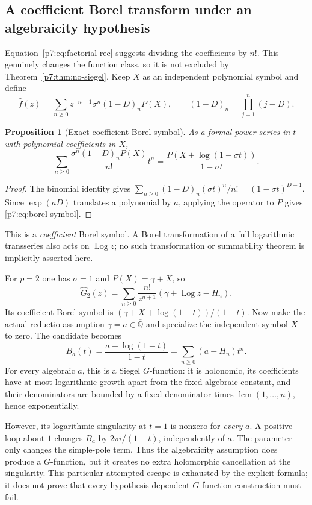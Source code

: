 \documentclass[11pt,a4paper]{article}
\newtheorem{proposition}[theorem]{Proposition}
\theoremstyle{definition}
\theoremstyle{remark}
\newcommand{\Qbar}{\overline{\mathbb Q}}
\DeclareMathOperator{\Log}{Log}
\DeclareMathOperator{\lcm}{lcm}
\numberwithin{equation}{section}
\begin{document}
\subsection{A coefficient Borel transform under an algebraicity hypothesis}

Equation~\eqref{p7:eq:factorial-rec} suggests dividing the coefficients by
$n!$. This genuinely changes the function class, so it is not excluded
by Theorem~\ref{p7:thm:no-siegel}. Keep $X$ as an independent polynomial
symbol and define
\[
 \widehat f(z)=
 \sum_{n\ge0}z^{-n-1}\sigma^n(1-D)_nP(X),
 \qquad
 (1-D)_n=\prod_{j=1}^n(j-D).
\]

\begin{proposition}[Exact coefficient Borel symbol]
\label{p7:prop:borel-symbol}
As a formal power series in $t$ with polynomial coefficients in $X$,
\begin{equation}
\label{p7:eq:borel-symbol}
 \sum_{n\ge0}
 \frac{\sigma^n(1-D)_nP(X)}{n!}t^n
 =
 \frac{P(X+\log(1-\sigma t))}{1-\sigma t}.
\end{equation}
\end{proposition}
\begin{proof}
The binomial identity gives
$\sum_{n\ge0}(1-D)_n(\sigma t)^n/n!=(1-\sigma t)^{D-1}$.
Since $\exp(aD)$ translates a polynomial by $a$, applying the operator
to $P$ gives \eqref{p7:eq:borel-symbol}.
\end{proof}

This is a \emph{coefficient} Borel symbol. A Borel transformation of a
full logarithmic transseries also acts on $\Log z$; no such
transformation or summability theorem is implicitly asserted here.

For $p=2$ one has $\sigma=1$ and $P(X)=\gamma+X$, so
\[
 \widehat G_2(z)
 =\sum_{n\ge0}\frac{n!}{z^{n+1}}
        (\gamma+\Log z-H_n).
\]
Its coefficient Borel symbol is
$(\gamma+X+\log(1-t))/(1-t)$. Now make the actual reductio assumption
$\gamma=a\in\Qbar$ and specialize the independent symbol $X$ to zero.
The candidate becomes
\begin{equation}
\label{p7:eq:conditional-G}
 B_a(t)=\frac{a+\log(1-t)}{1-t}
       =\sum_{n\ge0}(a-H_n)t^n.
\end{equation}
For every algebraic $a$, this is a Siegel $G$-function: it is
holonomic, its coefficients have at most logarithmic growth apart from
the fixed algebraic constant, and their denominators are bounded by a
fixed denominator times $\lcm(1,\ldots,n)$, hence exponentially.

However, its logarithmic singularity at $t=1$ is nonzero for
\emph{every} $a$. A positive loop about $1$ changes $B_a$ by
$2\pi i/(1-t)$, independently of $a$. The parameter only changes the
simple-pole term. Thus the algebraicity assumption does produce a
$G$-function, but it creates no extra holomorphic cancellation at the
singularity. This particular attempted escape is exhausted by the
explicit formula; it does not prove that every hypothesis-dependent
$G$-function construction must fail.
\end{document}
